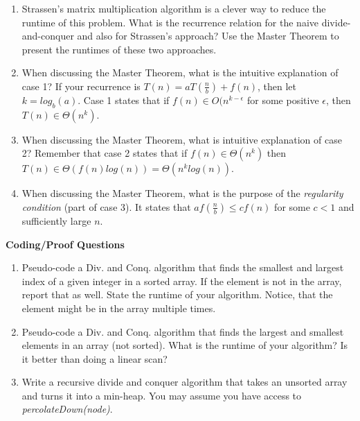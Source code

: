 \documentclass[10pt]{article}
\begin{document}
\begin{enumerate}
	\setlength\itemsep{0.25em}
	\item Strassen's matrix multiplication algorithm is a clever way to reduce the runtime of this problem. What is the recurrence relation for the naive divide-and-conquer and also for Strassen's approach? Use the Master Theorem to present the runtimes of these two approaches.
	\item When discussing the Master Theorem, what is the intuitive explanation of case 1? If your recurrence is $T(n)=aT(\frac{n}{b})+f(n)$, then let $k=log_b(a)$. Case 1 states that if $f(n) \in O(n^{k-\epsilon}$ for some positive $\epsilon$, then $T(n) \in \Theta(n^k)$.
	\item When discussing the Master Theorem, what is intuitive explanation of case 2? Remember that case 2 states that if $f(n) \in \Theta(n^k)$ then $T(n) \in \Theta(f(n)log(n)) = \Theta(n^klog(n))$.
	\item When discussing the Master Theorem, what is the purpose of the \emph{regularity condition} (part of case 3). It states that $af(\frac{n}{b}) \leq cf(n)$ for some $c<1$ and sufficiently large $n$.
\end{enumerate}

\vspace{0.5in}

\textbf{Coding/Proof Questions}
\begin{enumerate}
	\setlength\itemsep{0.25em}
	\item Pseudo-code a Div. and Conq. algorithm that finds the smallest and largest index of a given integer in a sorted array. If the element is not in the array, report that as well. State the runtime of your algorithm. Notice, that the element might be in the array multiple times.
	\item Pseudo-code a Div. and Conq. algorithm that finds the largest and smallest elements in an array (not sorted). What is the runtime of your algorithm? Is it better than doing a linear scan?
	\item Write a recursive divide and conquer algorithm that takes an unsorted array and turns it into a min-heap. You may assume you have access to \emph{percolateDown(node)}.
\end{enumerate}


\end{document}

